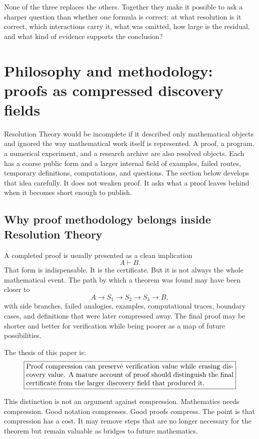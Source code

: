 \documentclass[11pt]{article}
\theoremstyle{definition}
\theoremstyle{remark}
\begin{document}
None of the three replaces the others.  Together they make it possible to ask a sharper question than whether one formula is correct: at what resolution is it correct, which interactions carry it, what was omitted, how large is the residual, and what kind of evidence supports the conclusion?


\section{Philosophy and methodology: proofs as compressed discovery fields}
\label{sec:proof-path-methodology}

Resolution Theory would be incomplete if it described only mathematical objects and ignored the way mathematical work itself is represented.  A proof, a program, a numerical experiment, and a research archive are also resolved objects.  Each has a coarse public form and a larger internal field of examples, failed routes, temporary definitions, computations, and questions.  The section below develops that idea carefully.  It does not weaken proof.  It asks what a proof leaves behind when it becomes short enough to publish.

\subsection{Why proof methodology belongs inside Resolution Theory}

A completed proof is usually presented as a clean implication
\[
        A\vdash B.
\]
That form is indispensable.  It is the certificate.  But it is not always the whole mathematical event.  The path by which a theorem was found may have been closer to
\[
        A\to S_1\to S_2\to S_3\to B,
\]
with side branches, failed analogies, examples, computational traces, boundary cases, and definitions that were later compressed away.  The final proof may be shorter and better for verification while being poorer as a map of future possibilities.

The thesis of this paper is:
\[
\boxed{\begin{minipage}{0.86\linewidth}
Proof compression can preserve verification value while erasing discovery value.  A mature account of proof should distinguish the final certificate from the larger discovery field that produced it.
\end{minipage}}
\]

This distinction is not an argument against compression.  Mathematics needs compression.  Good notation compresses.  Good proofs compress.  The point is that compression has a cost.  It may remove steps that are no longer necessary for the theorem but remain valuable as bridges to future mathematics.
\end{document}
